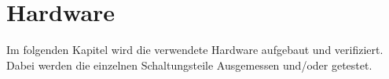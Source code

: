 \section{Hardware}\label{sec:Hardware}

Im folgenden Kapitel wird die verwendete Hardware aufgebaut und verifiziert. Dabei werden die einzelnen Schaltungsteile Ausgemessen und/oder getestet. 